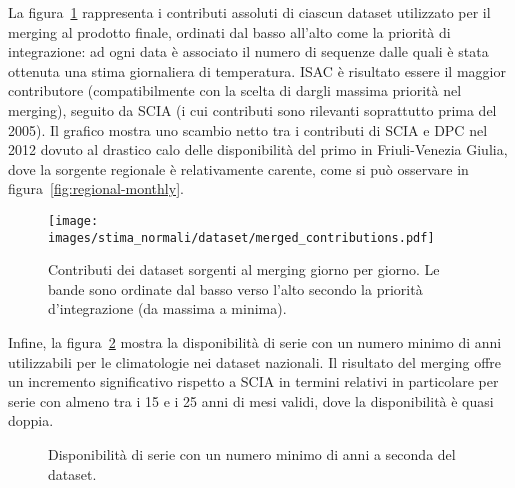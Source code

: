 La figura~\ref{fig:merged-contributions} rappresenta i contributi assoluti di ciascun dataset utilizzato per il merging al prodotto finale, ordinati dal basso all'alto come la priorità di integrazione: ad ogni data è associato il numero di sequenze dalle quali è stata ottenuta una stima giornaliera di temperatura. ISAC è risultato essere il maggior contributore (compatibilmente con la scelta di dargli massima priorità nel merging), seguito da SCIA (i cui contributi sono rilevanti soprattutto prima del 2005). Il grafico mostra uno scambio netto tra i contributi di SCIA e DPC nel 2012 dovuto al drastico calo delle disponibilità del primo in Friuli-Venezia Giulia, dove la sorgente regionale è relativamente carente, come si può osservare in figura~\ref{fig:regional-monthly}.
\begin{figure}[ht]
  \centering
  \texttt{[image: images/stima\_normali/dataset/merged\_contributions.pdf]}
  \caption{Contributi dei dataset sorgenti al merging giorno per giorno. Le bande sono ordinate dal basso verso l'alto secondo la priorità d'integrazione (da massima a minima).}\label{fig:merged-contributions}
\end{figure}

Infine, la figura~\ref{fig:merged-improvements} mostra la disponibilità di serie con un numero minimo di anni utilizzabili per le climatologie nei dataset nazionali. Il risultato del merging offre un incremento significativo rispetto a SCIA in termini relativi in particolare per serie con almeno tra i 15 e i 25 anni di mesi validi, dove la disponibilità è quasi doppia.
\begin{figure}[ht]
  \centering
  
  \caption{Disponibilità di serie con un numero minimo di anni a seconda del dataset.}\label{fig:merged-improvements}
\end{figure}
